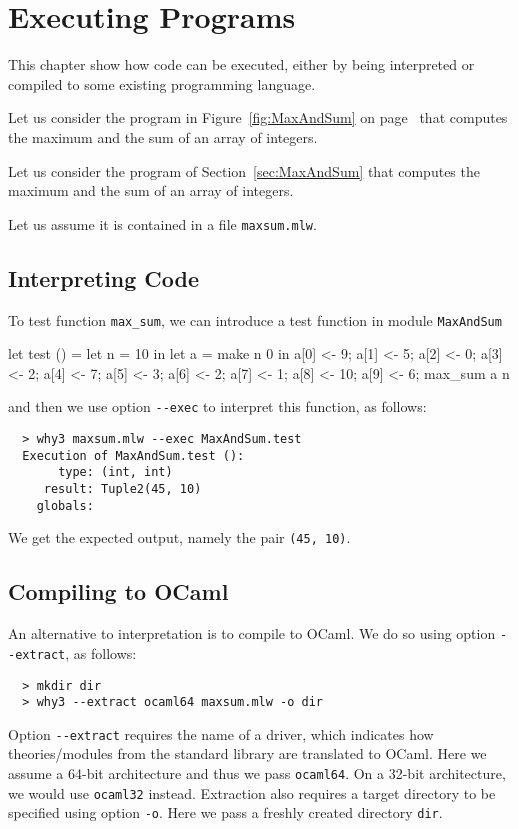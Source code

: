 
\chapter{Executing \whyml Programs}
\label{chap:exec}

This chapter show how \whyml code can be executed, either by being
interpreted or compiled to some existing programming language.

\begin{latexonly}
Let us consider the program in Figure~\ref{fig:MaxAndSum}
on page~\pageref{fig:MaxAndSum} that computes the maximum and the sum
of an array of integers.
\end{latexonly}
\begin{htmlonly}
Let us consider the program of Section~\ref{sec:MaxAndSum} that computes
the maximum and the sum of an array of integers.
\end{htmlonly}
Let us assume it is contained in a file \texttt{maxsum.mlw}.

\section{Interpreting \whyml Code}

To test function \texttt{max\_sum}, we can introduce a \whyml test function
in module \texttt{MaxAndSum}
\begin{whycode}
  let test () =
    let n = 10 in
    let a = make n 0 in
    a[0] <- 9; a[1] <- 5; a[2] <- 0; a[3] <- 2;  a[4] <- 7;
    a[5] <- 3; a[6] <- 2; a[7] <- 1; a[8] <- 10; a[9] <- 6;
    max_sum a n
\end{whycode}
and then we use option \verb+--exec+ to interpret this function,
as follows:
\begin{verbatim}
  > why3 maxsum.mlw --exec MaxAndSum.test
  Execution of MaxAndSum.test ():
       type: (int, int)
     result: Tuple2(45, 10)
    globals:
\end{verbatim}
We get the expected output, namely the pair \texttt{(45, 10)}.

\section{Compiling \whyml to OCaml}

An alternative to interpretation is to compile \whyml to OCaml.
We do so using option \verb+--extract+, as follows:
\begin{verbatim}
  > mkdir dir
  > why3 --extract ocaml64 maxsum.mlw -o dir
\end{verbatim}
Option \verb+--extract+ requires the name of a driver, which indicates
how theories/modules from the \why standard library are translated to
OCaml. Here we assume a 64-bit architecture and thus we pass
\texttt{ocaml64}. On a 32-bit architecture, we would use
\texttt{ocaml32} instead. Extraction also requires a target directory
to be specified using option \verb+-o+. Here we pass a freshly created
directory \texttt{dir}.


